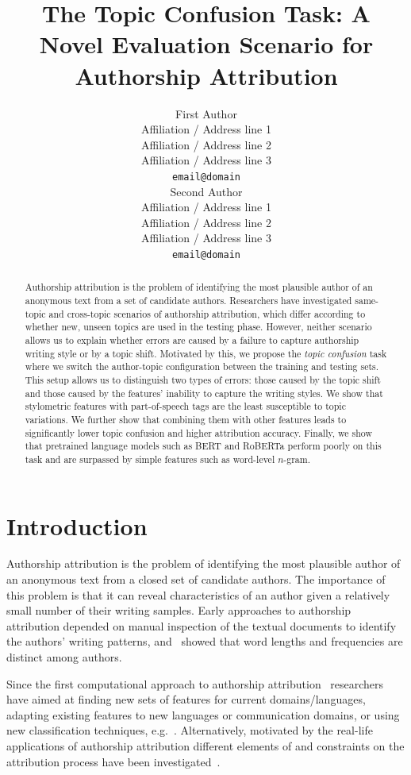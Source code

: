 \documentclass[11pt]{article}
\title{The Topic Confusion Task: A Novel Evaluation Scenario for Authorship Attribution}
\author{First Author \\
  Affiliation / Address line 1 \\
  Affiliation / Address line 2 \\
  Affiliation / Address line 3 \\
  \texttt{email@domain} \\\And
  Second Author \\
  Affiliation / Address line 1 \\
  Affiliation / Address line 2 \\
  Affiliation / Address line 3 \\
  \texttt{email@domain} \\}
\date{}
\begin{document}
\maketitle
\begin{abstract}
Authorship attribution is the problem of identifying the most plausible author of an anonymous text from a set of candidate authors. 
% 
Researchers have investigated same-topic and cross-topic scenarios of authorship attribution, which differ according to whether new, unseen topics are used in the testing phase. However, neither scenario allows us to explain whether errors are caused by a failure to capture authorship writing style or by a topic shift.
% 
Motivated by this, we propose the \emph{topic confusion} task where we switch the author-topic configuration between the training and testing sets. This setup allows us to distinguish two types of errors: those caused by the topic shift and those caused by the features' inability to capture the writing styles. 
%
We show that stylometric features with part-of-speech tags are the least susceptible to topic variations. We further show that combining them with other features leads to significantly lower topic confusion and higher attribution accuracy. Finally, we show that pretrained language models such as BERT and RoBERTa perform poorly on this task and are surpassed by simple features such as word-level $n$-gram.
\end{abstract}

\section{Introduction}
Authorship attribution is the problem of identifying the most plausible author of an anonymous text from a closed set of candidate authors. The importance of this problem is that it can reveal characteristics of an author given a relatively small number of their writing samples. Early approaches to authorship attribution depended on manual inspection of the textual documents to identify the authors' writing patterns, and~\citet{mendenhall1887characteristic} showed that word lengths and frequencies are distinct among authors. 

Since the first computational approach to authorship attribution~\citet{Mosteller.f:1964} researchers have aimed at finding new sets of features for current domains/languages, adapting existing features to new languages or communication domains, or using new classification techniques, e.g.~\citep{Abbasi.A:2006,Stamatatos.E:2013,silva2011twazn,layton2012authorship,Iqbal.F:2013,zhang2018syntax,malik:2018,Barlas2020}. Alternatively, motivated by the real-life applications of authorship attribution different elements of and constraints on the attribution process have been investigated~\citep{houvardas2006n,Luyckx.K:2011,goldstein2009person,Stamatatos.E:2013,wang-etal-2021-mode}. 
\end{document}
